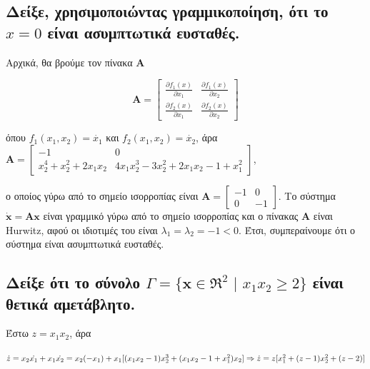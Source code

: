 \documentclass{article}
\begin{document}
\subsection{Δείξε, χρησιμοποιώντας γραμμικοποίηση, ότι το \(x = 0\) είναι ασυμπτωτικά ευσταθές.}
Αρχικά, θα βρούμε τον πίνακα \(\textbf{A}\)

\begin{equation*}
    \textbf{A} =
    \begin{bmatrix}
        \frac{\partial f_1(x)}{\partial x_1} & \frac{\partial f_1(x)}{\partial x_2} \\
        \frac{\partial f_2(x)}{\partial x_1} & \frac{\partial f_2(x)}{\partial x_2}
    \end{bmatrix}
\end{equation*}

\hfill\break
όπου \(f_1(x_1, x_2) = \dot{x_1}\) και \(f_2(x_1, x_2) = \dot{x_2}\), άρα
\begin{math}
    \textbf{A} =
    \begin{bmatrix}
        -1 & 0 \\
        x_2^4 + x_2^2 + 2 x_1 x_2 & 4 x_1 x_2^3 - 3 x_2^2 + 2 x_1 x_2 - 1 + x_1^2
    \end{bmatrix}
\end{math},

\hfill\break
ο οποίος γύρω από το σημείο ισορροπίας είναι
\begin{math}
    \textbf{A} =
    \begin{bmatrix}
        -1 & 0 \\
        0 & -1
    \end{bmatrix}
\end{math}. Το σύστημα \(\dot{\textbf{x}} = \textbf{A}\textbf{x}\) είναι γραμμικό γύρω από το σημείο ισορροπίας και ο πίνακας \(\textbf{A}\) είναι Hurwitz, αφού οι ιδιοτιμές του είναι \(λ_1 = λ_2 = -1 < 0\). Έτσι, συμπεραίνουμε ότι ο σύστημα είναι ασυμπτωτικά ευσταθές.

\subsection{Δείξε ότι το σύνολο \(Γ = \{\textbf{x} \in \Re^2\,\,|\,\,x_1x_2 \geq 2\}\) είναι θετικά αμετάβλητο.}
Έστω \(z = x_1x_2\), άρα

\hfill\break
\begin{math}
    \dot{z} = x_2\dot{x_1} + x_1\dot{x_2} = x_2 (-x_1) + x_1 [(x_1 x_2 - 1) x_2^3 + (x_1 x_2 - 1 + x_1^2)x_2] \Rightarrow \\[10pt]
    \dot{z} = z [x_1^2 + (z-1) x_2^2 + (z-2)]
\end{math}
\end{document}
